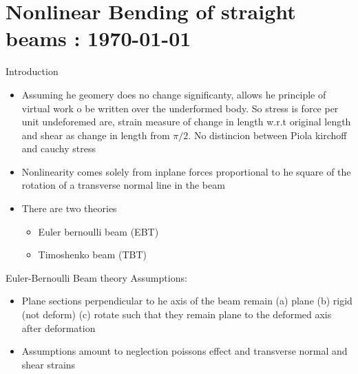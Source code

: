 




	\tableofcontents

\section{Nonlinear Bending of straight beams : \today}
	\begin{frame}{Introduction}
		\begin{itemize}
			\item Assuming he geomery does no change significanty, allows he principle of virtual work o be written over the underformed body. So stress is force per unit undeforemed are, strain measure of change in length w.r.t original length and shear as change in length from $\pi/2$. No distincion between Piola kirchoff and cauchy stress
			\item Nonlinearity comes solely from inplane forces proportional to he square of the rotation of a transverse normal line in the beam
			\item There are two theories
				\begin{itemize}
					\item Euler bernoulli beam (EBT)
					\item Timoshenko beam (TBT)
					
				\end{itemize}
		\end{itemize}
	\end{frame}


	\begin{frame}{Euler-Bernoulli Beam theory}
		Assumptions:
		\begin{itemize}
			\item Plane sections perpendicular to he axis of the beam remain (a) plane (b) rigid (not deform) (c) rotate such that they remain plane to the deformed axis after deformation
			\item  Assumptions amount to neglection poissons effect and transverse normal and shear strains
		\end{itemize}
	\end{frame}


